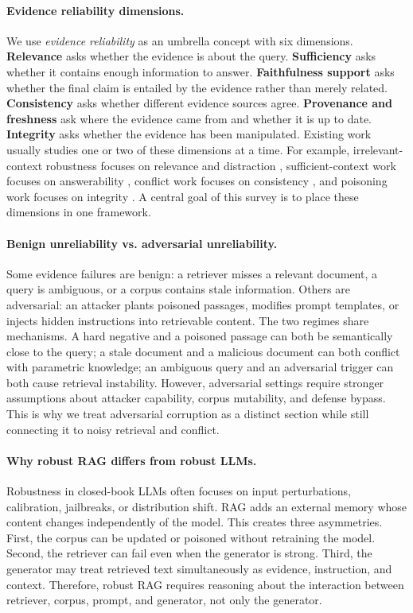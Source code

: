 \documentclass[11pt]{article}
\begin{document}
\paragraph{Evidence reliability dimensions.}
We use \emph{evidence reliability} as an umbrella concept with six dimensions. \textbf{Relevance} asks whether the evidence is about the query. \textbf{Sufficiency} asks whether it contains enough information to answer. \textbf{Faithfulness support} asks whether the final claim is entailed by the evidence rather than merely related. \textbf{Consistency} asks whether different evidence sources agree. \textbf{Provenance and freshness} ask where the evidence came from and whether it is up to date. \textbf{Integrity} asks whether the evidence has been manipulated. Existing work usually studies one or two of these dimensions at a time. For example, irrelevant-context robustness focuses on relevance and distraction \citep{irrelevantContext2023}, sufficient-context work focuses on answerability \citep{sufficientContext2024}, conflict work focuses on consistency \citep{tugOfWar2024,faithfulRAG2025}, and poisoning work focuses on integrity \citep{poisonedRAG2024,badRAG2024}. A central goal of this survey is to place these dimensions in one framework.

\paragraph{Benign unreliability vs. adversarial unreliability.}
Some evidence failures are benign: a retriever misses a relevant document, a query is ambiguous, or a corpus contains stale information. Others are adversarial: an attacker plants poisoned passages, modifies prompt templates, or injects hidden instructions into retrievable content. The two regimes share mechanisms. A hard negative and a poisoned passage can both be semantically close to the query; a stale document and a malicious document can both conflict with parametric knowledge; an ambiguous query and an adversarial trigger can both cause retrieval instability. However, adversarial settings require stronger assumptions about attacker capability, corpus mutability, and defense bypass. This is why we treat adversarial corruption as a distinct section while still connecting it to noisy retrieval and conflict.

\paragraph{Why robust RAG differs from robust LLMs.}
Robustness in closed-book LLMs often focuses on input perturbations, calibration, jailbreaks, or distribution shift. RAG adds an external memory whose content changes independently of the model. This creates three asymmetries. First, the corpus can be updated or poisoned without retraining the model. Second, the retriever can fail even when the generator is strong. Third, the generator may treat retrieved text simultaneously as evidence, instruction, and context. Therefore, robust RAG requires reasoning about the interaction between retriever, corpus, prompt, and generator, not only the generator.
\end{document}
